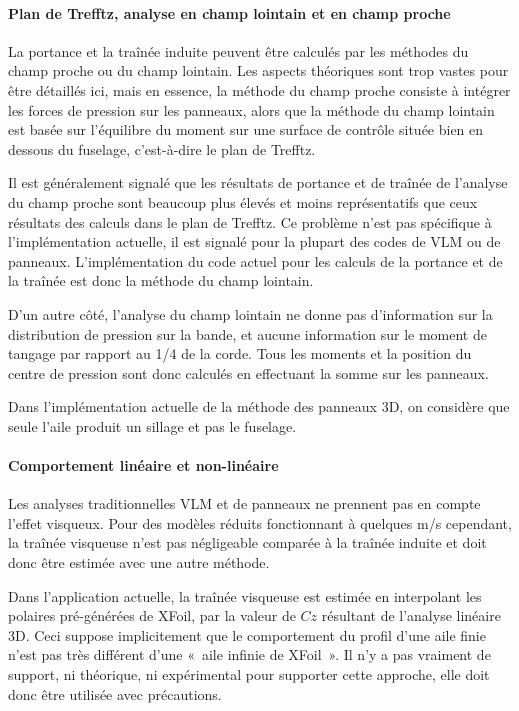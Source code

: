 \documentclass[a4paper,twoside,12pt,dvips]{article}
\begin{document}
\paragraph{Plan de Trefftz, analyse en champ lointain et en champ proche} 
La portance et la traînée induite peuvent être calculés par les méthodes du champ proche ou du champ lointain. Les aspects théoriques sont trop vastes pour être détaillés ici, mais en essence, la méthode du champ proche consiste à intégrer les forces de pression sur les panneaux, alors que la méthode du champ lointain est basée sur l’équilibre du moment sur une surface de contrôle située bien en dessous du fuselage, c’est-à-dire le plan de Trefftz.

Il est généralement signalé que les résultats de portance et de traînée de  l’analyse du champ proche sont beaucoup plus élevés et moins représentatifs que ceux résultats des calculs dans le plan de Trefftz. Ce problème n’est pas spécifique à l’implémentation actuelle, il est signalé pour la plupart des codes de VLM ou de panneaux. L’implémentation du code actuel pour les calculs de la portance et de la traînée est donc la méthode du champ lointain.

D’un autre côté, l’analyse du champ lointain ne donne pas d’information sur la distribution de pression sur la bande, et aucune information sur le moment de tangage par rapport au 1/4 de la corde. Tous les moments et la position du centre de pression sont donc calculés en effectuant la somme sur les panneaux. 

Dans l’implémentation actuelle de la méthode des panneaux 3D, on considère que seule l’aile produit un sillage et pas le fuselage. 

\clearpage

\paragraph{Comportement linéaire et non-linéaire}
Les analyses traditionnelles VLM et de panneaux ne prennent pas en compte l’effet visqueux. Pour des modèles réduits fonctionnant à quelques m/s cependant, la traînée visqueuse n’est pas négligeable comparée à la traînée induite et doit donc être estimée avec une autre méthode.

Dans l’application actuelle, la traînée visqueuse est estimée en interpolant les polaires pré-générées de XFoil, par la valeur de $Cz$ résultant de l’analyse linéaire 3D. Ceci suppose implicitement que le comportement du profil d’une aile finie n’est pas très différent d’une «~aile infinie de XFoil~». Il n’y a pas vraiment de support, ni théorique, ni expérimental pour supporter cette approche, elle doit donc être utilisée avec précautions.
\end{document}
